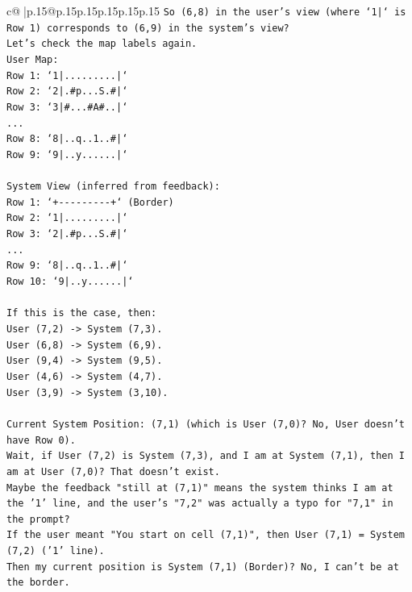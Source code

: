 \documentclass{article}
\begin{document}
{\begin{supertabular}{c@{$\;$}|p{.15\linewidth}@{}p{.15\linewidth}p{.15\linewidth}p{.15\linewidth}p{.15\linewidth}p{.15\linewidth}}
{{{\texttt{So (6,8) in the user's view (where `1|` is Row 1) corresponds to (6,9) in the system's view?} \\
\texttt{Let's check the map labels again.} \\
\texttt{User Map:} \\
\texttt{Row 1: `1|.........|`} \\
\texttt{Row 2: `2|.\#p...S.\#|`} \\
\texttt{Row 3: `3|\#...\#A\#..|`} \\
\texttt{...} \\
\texttt{Row 8: `8|..q..1..\#|`} \\
\texttt{Row 9: `9|..y......|`} \\
\\ 
\texttt{System View (inferred from feedback):} \\
\texttt{Row 1: `+{-}{-}{-}{-}{-}{-}{-}{-}{-}+` (Border)} \\
\texttt{Row 2: `1|.........|`} \\
\texttt{Row 3: `2|.\#p...S.\#|`} \\
\texttt{...} \\
\texttt{Row 9: `8|..q..1..\#|`} \\
\texttt{Row 10: `9|..y......|`} \\
\\ 
\texttt{If this is the case, then:} \\
\texttt{User (7,2) {-}> System (7,3).} \\
\texttt{User (6,8) {-}> System (6,9).} \\
\texttt{User (9,4) {-}> System (9,5).} \\
\texttt{User (4,6) {-}> System (4,7).} \\
\texttt{User (3,9) {-}> System (3,10).} \\
\\ 
\texttt{Current System Position: (7,1) (which is User (7,0)? No, User doesn't have Row 0).} \\
\texttt{Wait, if User (7,2) is System (7,3), and I am at System (7,1), then I am at User (7,0)? That doesn't exist.} \\
\texttt{Maybe the feedback "still at (7,1)" means the system thinks I am at the '1' line, and the user's "7,2" was actually a typo for "7,1" in the prompt?} \\
\texttt{If the user meant "You start on cell (7,1)", then User (7,1) = System (7,2) ('1' line).} \\
\texttt{Then my current position is System (7,1) (Border)? No, I can't be at the border.} \\
}}}
\end{supertabular}}
\end{document}
